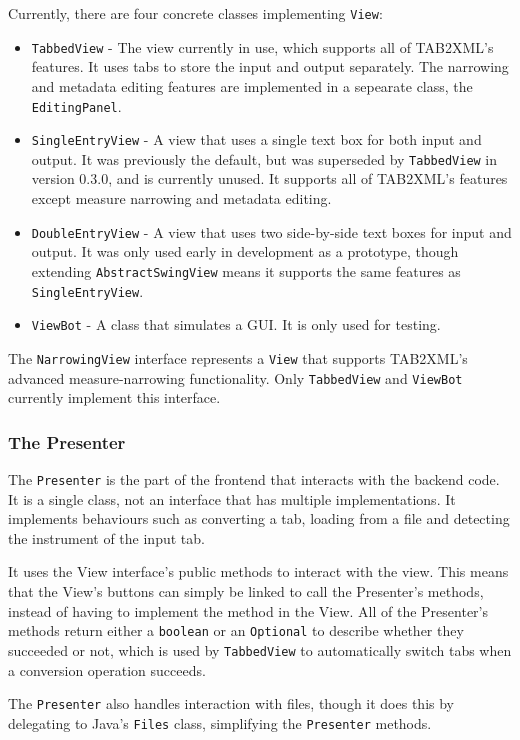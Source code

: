 \documentclass[11pt]{article}
\begin{document}
Currently, there are four concrete classes implementing \texttt{View}:
\begin{itemize}
\item \texttt{TabbedView} - The view currently in use, which supports all of TAB2XML's features.  It uses tabs to store the input and output separately.  The narrowing and metadata editing features are implemented in a sepearate class, the \texttt{EditingPanel}.
\item \texttt{SingleEntryView} - A view that uses a single text box for both input and output.  It was previously the default, but was superseded by \texttt{TabbedView} in version 0.3.0, and is currently unused.  It supports all of TAB2XML's features except measure narrowing and metadata editing.
\item \texttt{DoubleEntryView} - A view that uses two side-by-side text boxes for input and output.  It was only used early in development as a prototype, though extending \texttt{AbstractSwingView} means it supports the same features as \texttt{SingleEntryView}.
\item \texttt{ViewBot} - A class that simulates a GUI.  It is only used for testing.
\end{itemize}

The \texttt{NarrowingView} interface represents a \texttt{View} that supports TAB2XML's advanced measure-narrowing functionality.  Only \texttt{TabbedView} and \texttt{ViewBot} currently implement this interface.
\subsubsection{The Presenter}
\label{sec:orgd22582e}
The \texttt{Presenter} is the part of the frontend that interacts with the backend code.  It is a single class, not an interface that has multiple implementations.  It implements behaviours such as converting a tab, loading from a file and detecting the instrument of the input tab.

It uses the View interface's public methods to interact with the view.  This means that the View's buttons can simply be linked to call the Presenter's methods, instead of having to implement the method in the View.  All of the Presenter's methods return either a \texttt{boolean} or an \texttt{Optional} to describe whether they succeeded or not, which is used by \texttt{TabbedView} to automatically switch tabs when a conversion operation succeeds.

The \texttt{Presenter} also handles interaction with files, though it does this by delegating to Java's \texttt{Files} class, simplifying the \texttt{Presenter} methods.
\end{document}
